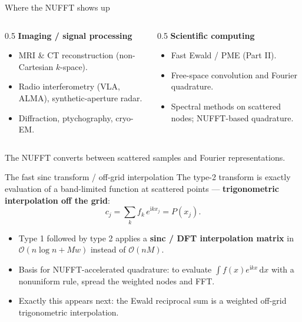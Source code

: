 \documentclass[aspectratio=169,11pt]{beamer}
\newcommand{\cO}{\mathcal{O}}
\newcommand{\dd}{\,\mathrm d}
\newcommand{\ii}{\mathrm i}
\newcommand{\hl}[1]{{\color{CCMorange}\textbf{#1}}}
\newcommand{\gray}[1]{{\color{mygray}#1}}
\begin{document}
\begin{frame}{Where the NUFFT shows up}
\small
\begin{columns}[T,totalwidth=\textwidth]
\begin{column}{0.5\textwidth}
\hl{Imaging / signal processing}
\begin{itemize}\itemsep2pt
  \item MRI \& CT reconstruction (non-Cartesian \(k\)-space).
  \item Radio interferometry (VLA, ALMA), synthetic-aperture radar.
  \item Diffraction, ptychography, cryo-EM.
\end{itemize}
\end{column}
\begin{column}{0.5\textwidth}
\hl{Scientific computing}
\begin{itemize}\itemsep2pt
  \item Fast Ewald / PME (Part II).
  \item Free-space convolution and Fourier quadrature.
  \item Spectral methods on scattered nodes; NUFFT-based quadrature.
\end{itemize}
\end{column}
\end{columns}
\vspace{3mm}
\centerline{\gray{The NUFFT converts between scattered samples and Fourier representations.}}
\end{frame}

\begin{frame}{The fast sinc transform / off-grid interpolation}
\small
The type-2 transform is exactly evaluation of a band-limited function at scattered points --- \hl{trigonometric interpolation off the grid}:
\[
  c_j = \sum_{k} f_k\, e^{\ii k x_j} = P(x_j).
\]
\begin{itemize}
  \item Type 1 followed by type 2 applies a \hl{sinc / DFT interpolation matrix} in \(\cO(n\log n + Mw)\) instead of \(\cO(nM)\).
  \item Basis for NUFFT-accelerated quadrature: to evaluate \(\int f(x)e^{\ii kx}\dd x\) with a nonuniform rule, spread the weighted nodes and FFT.
  \item Exactly this appears next: the Ewald reciprocal sum is a weighted off-grid trigonometric interpolation.
\end{itemize}
\end{frame}
\end{document}

